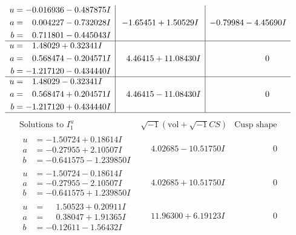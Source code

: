 \documentclass[1p]{elsarticle_modified}
\theoremstyle{definition}
\newcommand{\I}{\sqrt{-1}}
\begin{document}
$$\begin{array}{c|c|c}
\begin{aligned}
u &= -0.016936 - 0.487875 I \\
a &= \phantom{-}0.004227 - 0.732028 I \\
b &= \phantom{-}0.711801 - 0.445043 I\end{aligned}
 & -1.65451 + 1.50529 I & -0.79984 - 4.45690 I \\ \hline\begin{aligned}
u &= \phantom{-}1.48029 + 0.32341 I \\
a &= \phantom{-}0.568474 - 0.204571 I \\
b &= -1.217120 - 0.434440 I\end{aligned}
 & \phantom{-}4.46415 + 11.08430 I & \phantom{-0.000000 } 0 \\ \hline\begin{aligned}
u &= \phantom{-}1.48029 - 0.32341 I \\
a &= \phantom{-}0.568474 + 0.204571 I \\
b &= -1.217120 + 0.434440 I\end{aligned}
 & \phantom{-}4.46415 - 11.08430 I & \phantom{-0.000000 } 0\\
 \hline 
 \end{array}$$\newpage$$\begin{array}{c|c|c}  
\text{Solutions to }I^u_{1}& \I (\text{vol} + \sqrt{-1}CS) & \text{Cusp shape}\\
 \hline 
\begin{aligned}
u &= -1.50724 + 0.18614 I \\
a &= -0.27955 + 2.10507 I \\
b &= -0.641575 - 1.239850 I\end{aligned}
 & \phantom{-}4.02685 - 10.51750 I & \phantom{-0.000000 } 0 \\ \hline\begin{aligned}
u &= -1.50724 - 0.18614 I \\
a &= -0.27955 - 2.10507 I \\
b &= -0.641575 + 1.239850 I\end{aligned}
 & \phantom{-}4.02685 + 10.51750 I & \phantom{-0.000000 } 0 \\ \hline\begin{aligned}
u &= \phantom{-}1.50523 + 0.20911 I \\
a &= \phantom{-}0.38047 + 1.91365 I \\
b &= -0.12611 - 1.56432 I\end{aligned}
 & \phantom{-}11.96300 + 6.19123 I & \phantom{-0.000000 } 0 \\ \hline\begin{aligned}

\end{aligned}
\end{array}$$
\end{document}
